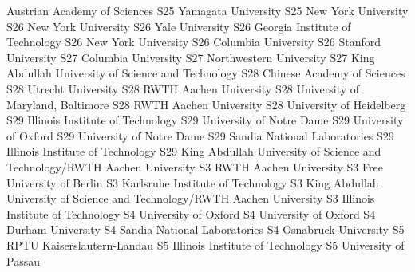 \begin{multicols}{2}
{Austrian Academy of Sciences}
{S25}
{}
{Yamagata University}
{S25}
{}
{New York University}
{S26}
{}
{New York University}
{S26}
{}
{Yale University}
{S26}
{}
{Georgia Institute of Technology}
{S26}
{}
{New York University}
{S26}
{}
{Columbia University}
{S26}
{}
{Stanford University}
{S27}
{}
{Columbia University}
{S27}
{}
{Northwestern University}
{S27}
{}
{King Abdullah University of Science and Technology}
{S28}
{}
{Chinese Academy of Sciences}
{S28}
{}
{Utrecht University}
{S28}
{}
{RWTH Aachen University}
{S28}
{}
{University of Maryland, Baltimore}
{S28}
{}
{RWTH Aachen University}
{S28}
{}
{University of Heidelberg}
{S29}
{}
{Illinois Institute of Technology}
{S29}
{}
{University of Notre Dame}
{S29}
{}
{University of Oxford}
{S29}
{}
{University of Notre Dame}
{S29}
{}
{Sandia National Laboratories}
{S29}
{}
{Illinois Institute of Technology}
{S29}
{}
{King Abdullah University of Science and Technology/RWTH Aachen University}
{S3}
{}
{RWTH Aachen University}
{S3}
{}
{Free University of Berlin}
{S3}
{}
{Karlsruhe Institute of Technology}
{S3}
{}
{King Abdullah University of Science and Technology/RWTH Aachen University}
{S3}
{}
{Illinois Institute of Technology}
{S4}
{}
{University of Oxford}
{S4}
{}
{University of Oxford}
{S4}
{}
{Durham University}
{S4}
{}
{Sandia National Laboratories}
{S4}
{}
{Osnabruck University}
{S5}
{}
{RPTU Kaiserslautern-Landau}
{S5}
{}
{Illinois Institute of Technology}
{S5}
{}
{University of Passau}

\end{multicols}
